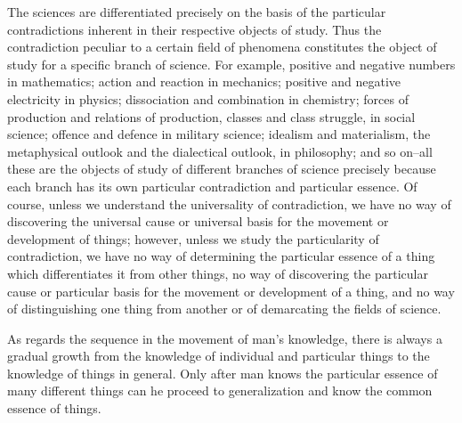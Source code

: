 \documentclass{article}
\begin{document}
The sciences are differentiated precisely on the basis of the particular
contradictions inherent in their respective objects of study. Thus the
contradiction peculiar to a certain field of phenomena constitutes the object
of study for a specific branch of science. For example, positive and negative
numbers in mathematics; action and reaction in mechanics; positive and negative
electricity in physics; dissociation and combination in chemistry; forces of
production and relations of production, classes and class struggle, in social
science; offence and defence in military science; idealism and materialism, the
metaphysical outlook and the dialectical outlook, in philosophy; and so on--all
these are the objects of study of different branches of science precisely
because each branch has its own particular contradiction and particular
essence. Of course, unless we understand the universality of contradiction, we
have no way of discovering the universal cause or universal basis for the
movement or development of things; however, unless we study the particularity
of contradiction, we have no way of determining the particular essence of
a thing which differentiates it from other things, no way of discovering the
particular cause or particular basis for the movement or development of
a thing, and no way of distinguishing one thing from another or of demarcating
the fields of science.

As regards the sequence in the movement of man's knowledge, there is always
a gradual growth from the knowledge of individual and particular things to the
knowledge of things in general. Only after man knows the particular essence of
many different things can he proceed to generalization and know the common
essence of things.
\end{document}
